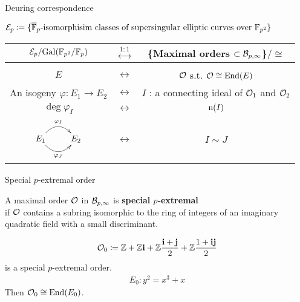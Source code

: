 \begin{frame}{Deuring correspondence}

    {\fontsize{11pt}{13pt}\selectfont
    $\mathcal{E}_p \coloneqq \{\overline{\mathbb{F}}_p\mbox{-isomorphisim classes of supersingular elliptic curves over }\mathbb{F}_{p^2} \}$\\
    \begin{itembox}{}
        \begin{center}
            \begin{tabular}{ccc}
                $\mathcal{E}_p/\mathrm{Gal}(\mathbb{F}_{p^2}/\mathbb{F}_p)$ & $\stackrel{1:1}{\longleftrightarrow}$
                    & \{Maximal orders $\subset \mathcal{B}_{p,\infty}$\}$/\cong$\\[5pt]\hline\\[5pt]
                $E$  & $\longleftrightarrow$
                    & $\mathcal{O}$ s.t. $\mathcal{O} \cong \mathrm{End}(E)$\\[7pt]
                An isogeny $\varphi: E_1 \to E_2$ & $\longleftrightarrow$
                    & $I$ : a connecting ideal of $\mathcal{O}_1$ and $\mathcal{O}_2$\\[7pt]
                $\deg\varphi_I$ & $\longleftrightarrow$ & $\mathrm{n}(I)$\\[7pt]
                $\xymatrix{
                    E_1 \ar@/^15pt/[r]^{{\varphi_I}} \ar@/_15pt/[r]_{{\varphi_J}} & E_2
                }$ & $\longleftrightarrow$ & $I \sim J$
            \end{tabular}
        \end{center}
    \end{itembox}
    }
\end{frame}

\begin{frame}{Special $p$-extremal order}
    \begin{definition}[Informal]
        A maximal order $\mathcal{O}$ in $\mathcal{B}_{p,\infty}$ is \textbf{special $p$-extremal}\\
        if $\mathcal{O}$ contains a subring isomorphic to
        the ring of integers of an imaginary quadratic field with a small discriminant.
    \end{definition}

    \begin{align*}
        \mathcal{O}_0 \coloneqq \mathbb{Z} + \mathbb{Z}\mathbf{i} + \mathbb{Z}\frac{\mathbf{i} + \mathbf{j}}{2} + \mathbb{Z}\frac{1 + \mathbf{i}\mathbf{j}}{2}
    \end{align*}
    is a special $p$-extremal order.
    \begin{align*}
        E_0 : y^2 = x^3 + x
    \end{align*}
    Then $\mathcal{O}_0 \cong \mathrm{End}(E_0)$.
\end{frame}

